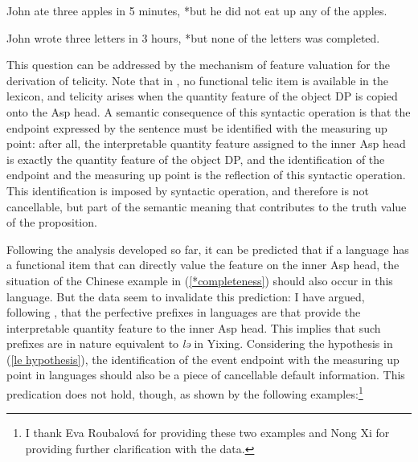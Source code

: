 \documentclass[output=paper]{langsci/langscibook}
\begin{document}
\begin{exe}
\ex John ate three apples in 5 minutes, *but he did not eat up any of the apples.
\end{exe}

\begin{exe}
\ex John wrote three letters in 3 hours, *but none of the letters was completed.
\end{exe}

This question can be addressed by the mechanism of feature valuation for the derivation of telicity. Note that in , no functional telic item is available in the lexicon, and telicity arises when the quantity feature of the object DP is copied onto the Asp head. A semantic consequence of this syntactic operation is that the endpoint expressed by the sentence must be identified with the measuring up point: after all, the interpretable quantity feature assigned to the inner Asp head is exactly the quantity feature of the object DP, and the identification of the endpoint and the measuring up point is the reflection of this syntactic operation. This identification is imposed by syntactic operation, and therefore is not cancellable, but part of the semantic meaning that contributes to the truth value of the proposition.


Following the analysis developed so far, it can be predicted that if a language
has a functional item that can directly value the feature on the inner
Asp head, the situation of the Chinese example in (\ref{*completeness})
should also occur in this language. But the  data seem to invalidate this
prediction: I have argued, following \textcite{Borer2005b}, that the perfective
prefixes in  languages are  that provide the
interpretable quantity feature to the inner Asp head. This implies that
such prefixes are in nature equivalent to \emph{lə} in Yixing. Considering the
hypothesis in (\ref{le hypothesis}), the identification of the event endpoint
with the measuring up point in  languages should also be a piece of
cancellable default information. This predication does not hold, though, as
shown by the following  examples:\footnote{I thank Eva Roubalov\'a for
providing these two examples and Nong Xi for providing further clarification
with the data.}\largerpage[2]
\end{document}
